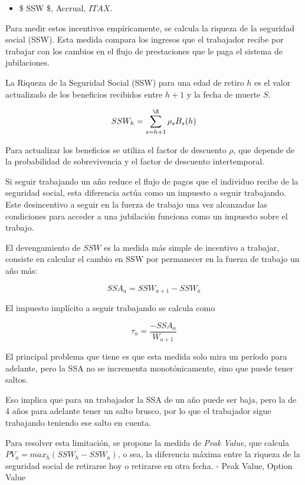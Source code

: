 \documentclass[]{article}
\providecommand{\tightlist}{%
  \setlength{\itemsep}{0pt}\setlength{\parskip}{0pt}}
\begin{document}
\begin{itemize}
\tightlist
\item
  \$ SSW \$, Accrual, \(ITAX\).
\end{itemize}

Para medir estos incentivos empíricamente, se calcula la riqueza de la
seguridad social (SSW). Esta medida compara los ingresos que el
trabajador recibe por trabajar con los cambios en el flujo de
prestaciones que le paga el sistema de jubilaciones.

La Riqueza de la Seguridad Social (SSW) para una edad de retiro \(h\) es
el valor actualizado de los beneficios recibidos entre \(h + 1\) y la
fecha de muerte \(S\).

\[ SSW_{h} = \sum_{s=h+1}^{\S} \rho_{s} B_{s}(h)\]

Para actualizar los beneficios se utiliza el factor de descuento
\(\rho\), que depende de la probabilidad de sobrevivencia y el factor de
descuento intertemporal.

Si seguir trabajando un año reduce el flujo de pagos que el individuo
recibe de la seguridad social, esta diferencia actúa como un impuesto a
seguir trabajando. Este desincentivo a seguir en la fuerza de trabajo
una vez alcanzadas las condiciones para acceder a una jubilación
funciona como un impuesto sobre el trabajo.

El devengamiento de \(SSW\) es la medida más simple de incentivo a
trabajar, consiste en calcular el cambio en SSW por permanecer en la
fuerza de trabajo un año más:

\[ SSA_{a} = SSW_{a+1} - SSW_{a}\]

El impuesto implícito a seguir trabajando se calcula como

\[ \tau_{a} = \frac{-SSA_{a}}{W_{a+1}}\]

El principal problema que tiene es que esta medida solo mira un período
para adelante, pero la SSA no se incrementa monotónicamente, sino que
puede tener saltos.

Eso implica que para un trabajador la SSA de un año puede ser baja, pero
la de 4 años para adelante tener un salto brusco, por lo que el
trabajador sigue trabajando teniendo ese salto en cuenta.

Para resolver esta limitación, se propone la medida de \emph{Peak
Value}, que calcula \(PV_{a} = max_{h}(SSW_{h}-SSW_{a})\), o sea, la
diferencia máxima entre la riqueza de la seguridad social de retirarse
hoy o retirarse en otra fecha. - Peak Value, Option Value
\end{document}
